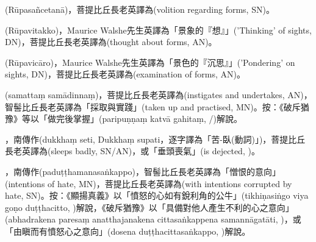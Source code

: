 \startitemgroup[noteitems]
\item{}(Rūpasañcetanā)，菩提比丘長老英譯為(volition regarding forms, SN)。
\item{}(Rūpavitakko)，Maurice Walshe先生英譯為「景象的『想』」('Thinking' of sights, DN)，菩提比丘長老英譯為(thought about forms, AN)。
\item{}(Rūpavicāro)，Maurice Walshe先生英譯為「景色的『沉思』」('Pondering' on sights, DN)，菩提比丘長老英譯為(examination of forms, AN)。
\stopitemgroup

\startitemgroup[noteitems]
\item{}(samattaṃ samādinnaṃ)，菩提比丘長老英譯為(instigates and undertakes, AN)，智髻比丘長老英譯為「採取與實踐」(taken up and practised, MN)。按：《破斥猶豫》等以「做完後掌握」(paripuṇṇaṃ katvā gahitaṃ, /)解說。
\stopitemgroup

\startitemgroup[noteitems]
\item{}，南傳作(dukkhaṃ seti, Dukkhaṃ supati，逐字譯為「苦-臥(動詞)」)，菩提比丘長老英譯為(sleeps badly, SN/AN)，或「垂頭喪氣」(is dejected, )。
\stopitemgroup

\startitemgroup[noteitems]
\item{}，南傳作(paduṭṭhamanasaṅkappo)，智髻比丘長老英譯為「憎恨的意向」(intentions of hate, MN)，菩提比丘長老英譯為(with intentions corrupted by hate, SN)。按：《顯揚真義》以「憤怒的心如有銳利角的公牛」(tikhiṇasiṅgo viya goṇo duṭṭhacitto, )解說，《破斥猶豫》以「具備對他人產生不利的心之意向」(abhadrakena paresaṃ anatthajanakena cittasaṅkappena samannāgatāti, )，或「由瞋而有憤怒心之意向」(dosena duṭṭhacittasaṅkappo, )解說。
\stopitemgroup

